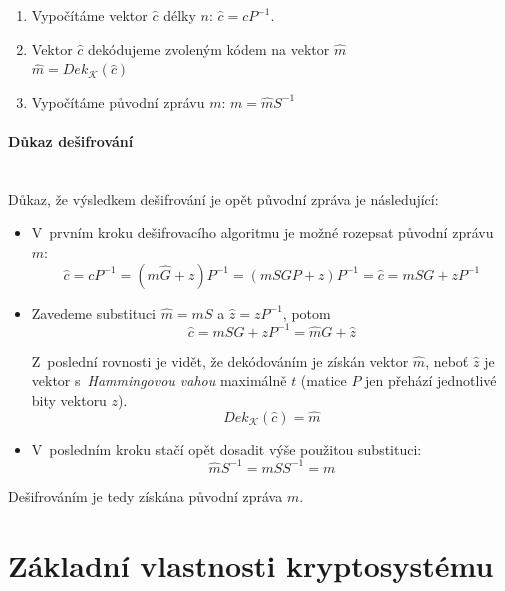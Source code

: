 \documentclass[thesis=M,czech,hidelinks]{FITthesis}[2012/06/26]
\newcommand{\0}{{\textcolor[gray]{0.75}{0}}}
\begin{document}
\begin{enumerate}
    \item Vypočítáme vektor $\hat{c}$ délky $n$: $\hat{c} = c P^{-1}$.
    \item Vektor $\hat{c}$ dekódujeme zvoleným kódem na vektor $\hat{m}$ \\
        $\hat{m} = Dek_{\mathcal{K}}\left(\hat{c}\right)$
    \item Vypočítáme původní zprávu $m$: $m = \hat{m} S^{-1}$
\end{enumerate}


\paragraph{Důkaz dešifrování} \hfil \\
Důkaz, že výsledkem dešifrování je opět původní zpráva je následující:

\begin{itemize}
    \item V~prvním kroku dešifrovacího algoritmu je možné rozepsat původní
        zprávu~$m$:
        $$
            \hat{c} = c P^{-1} = \left( m \hat{G} + z \right) P^{-1} =
            \left(m S G P + z \right) P^{-1} = \hat{c} = m S G + z P^{-1}
        $$

    \item Zavedeme substituci $\hat{m} = m S$ a $\hat{z} = z P^{-1}$, potom
        $$ \hat{c} = m S G + z P^{-1} = \hat{m} G + \hat{z} $$

        Z~poslední rovnosti je vidět, že dekódováním je získán vektor $\hat{m}$,
        neboť $\hat{z}$ je vektor s~\emph{Hammingovou vahou} maximálně $t$
        (matice $P$ jen přehází jednotlivé bity vektoru $z$).
        $$ Dek_{\mathcal{K}}\left(\hat{c}\right) = \hat{m} $$

    \item V~posledním kroku stačí opět dosadit výše použitou substituci:
        $$ \hat{m} S^{-1} = m S S^{-1} = m $$

\end{itemize}

Dešifrováním je tedy získána původní zpráva $m$.



\section{Základní vlastnosti kryptosystému}
\end{document}
